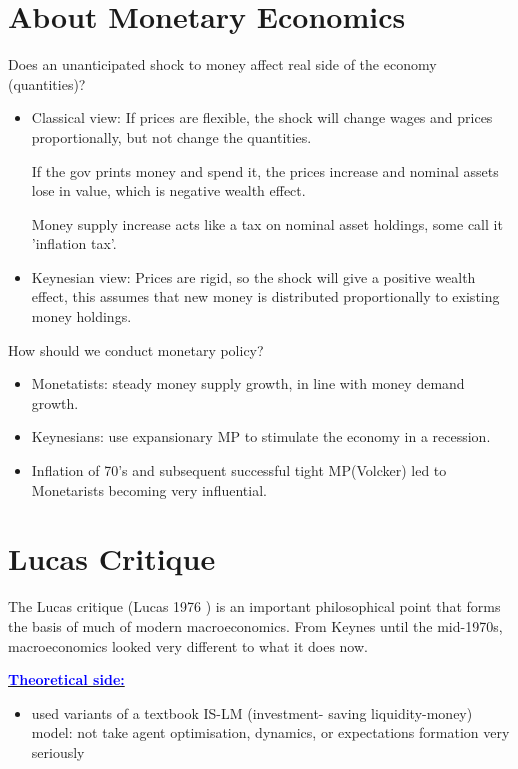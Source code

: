 \section{About Monetary Economics}

Does an unanticipated shock to money affect real side of the
economy (quantities)?

\begin{itemize}
    \item Classical view: If prices are flexible, the shock
    will change wages and prices proportionally, but not change the quantities.

    If the gov prints money and spend it, the prices increase and nominal assets lose in value, 
    which is negative wealth effect.

    Money supply increase acts like a tax on nominal asset 
    holdings, some call it 'inflation tax'.

    \item Keynesian view: Prices are rigid, so the shock will
    give a positive wealth effect, this assumes that new money is distributed proportionally to existing money holdings.
\end{itemize}

How should we conduct monetary policy?

\begin{itemize}
    \item Monetatists: steady money supply growth, in line with money
    demand growth.
    \item Keynesians: use expansionary MP to stimulate the economy
    in a recession.
    \item Inﬂation of 70's and subsequent successful tight MP(Volcker)
    led to Monetarists becoming very inﬂuential.
\end{itemize}

\section{Lucas Critique}

The Lucas critique (Lucas 1976 \cite{lucas1976econometric}) is an important philosophical point that forms the basis of much
of modern macroeconomics.
From Keynes until the mid-1970s, macroeconomics looked very different
to what it does now.

\underline{\textcolor{blue}{\textbf{Theoretical side:}}}
\begin{itemize}
    \item used variants of a textbook IS-LM (investment-
    saving liquidity-money) model: not take agent optimisation, dynamics, or expectations
    formation very seriously
\end{itemize}

